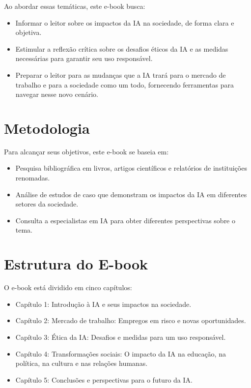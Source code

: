 \documentclass[12pt,twoside]{book}
\begin{document}
Ao abordar essas temáticas, este e-book busca:
\begin{itemize}
    \item Informar o leitor sobre os impactos da IA na sociedade, de forma clara e objetiva.
    \item Estimular a reflexão crítica sobre os desafios éticos da IA e as medidas necessárias para garantir seu uso responsável.
    \item Preparar o leitor para as mudanças que a IA trará para o mercado de trabalho e para a sociedade como um todo, fornecendo ferramentas para navegar nesse novo cenário.
\end{itemize}

\section{Metodologia}

Para alcançar seus objetivos, este e-book se baseia em:
\begin{itemize}
    \item Pesquisa bibliográfica em livros, artigos científicos e relatórios de instituições renomadas.
    \item Análise de estudos de caso que demonstram os impactos da IA em diferentes setores da sociedade.
    \item Consulta a especialistas em IA para obter diferentes perspectivas sobre o tema.
\end{itemize}

\section{Estrutura do E-book}

O e-book está dividido em cinco capítulos:
\begin{itemize}
    \item Capítulo 1: Introdução à IA e seus impactos na sociedade.
    \item Capítulo 2: Mercado de trabalho: Empregos em risco e novas oportunidades.
    \item Capítulo 3: Ética da IA: Desafios e medidas para um uso responsável.
    \item Capítulo 4: Transformações sociais: O impacto da IA na educação, na política, na cultura e nas relações humanas.
    \item Capítulo 5: Conclusões e perspectivas para o futuro da IA.
\end{itemize}
\end{document}

